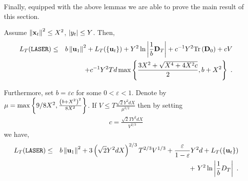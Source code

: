 Finally, equipped with the above lemmas we are able to
prove the main
result of this section.
\begin{corollary}
\label{cor:main_corollary}
Assume $\left\Vert {\mathbf{x}_{t}} \right\Vert^2\leq X^2$, $\vert y_{t}\vert \leq Y$. Then,
\begin{eqnarray}
L_T(\texttt{LASER})&\leq&
  b\left\Vert
     \mathbf{u}_{1}\right\Vert ^{2}+L_T(\{\mathbf{u}_{t}\})+Y^{2} \ln\left|\frac{1}{b}\mathbf{D}_{T}\right|
     +c^{-1}Y^2{\rm Tr}\left({\mathbf{D}_0}\right)+c V\nonumber\\
& & +c^{-1}Y^2 T d  \max\left\{{ \frac{3X^2 +
   \sqrt{X^4+4X^2 c}}{2},b+X^2}\right\}~.\label{final_cor}
\end{eqnarray}

Furthermore, set $b=\varepsilon c$ for some $0<\varepsilon<1$.
Denote by
\(
\mu = \max\left\{{9/8X^2, \frac{\left({b+X^2}\right)^2}{8X^2}}\right\}
\).
If $V \leq T \frac{\sqrt{2}Y^2dX}{\mu^{3/2}}$ then by setting
\begin{align}
c= \frac{\sqrt{2}T Y^2 d X}{V^{2/3}}\label{c1}
\end{align}
 we have,
\begin{eqnarray}
L_T(\texttt{LASER})
&\leq& b\left\Vert \vui{1}\right\Vert ^{2} + 3\paren{\sqrt{2}Y^2 d X}^{2/3} T^{2/3} V^{1/3}+\frac{\varepsilon}{1-\varepsilon}Y^{2}d +L_T(\{\vui{t}\})%
\nonumber\\
&& +~Y^{2} \ln\left|\frac{1}{b}D_{T}\right|\label{bound1}~.
\end{eqnarray}



\end{corollary}
